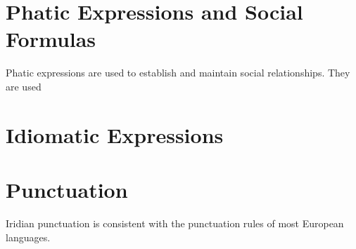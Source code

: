 \section{Phatic Expressions and Social Formulas}

Phatic expressions are used to establish and maintain social relationships. They are used 

\section{Idiomatic Expressions}

\section{Punctuation}\label{sec:punctuation}

Iridian punctuation is consistent with the punctuation rules of most European languages.

